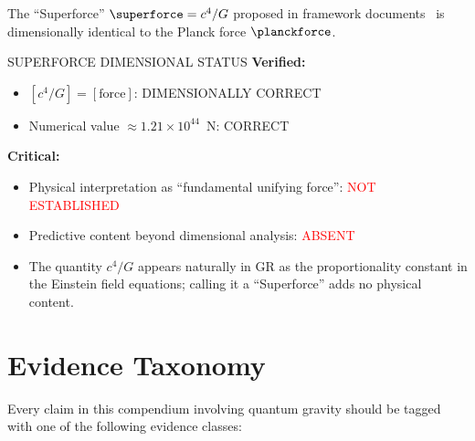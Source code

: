 The ``Superforce'' $\superforce = c^4/G$ proposed in framework
documents~\cite{pais2023superforce} is dimensionally identical to
the Planck force $\planckforce$.

\begin{factcheck}{SUPERFORCE DIMENSIONAL STATUS}
\textbf{Verified:}
\begin{itemize}
    \item $[c^4/G] = [\text{force}]$:
          \textcolor{validcolor}{DIMENSIONALLY CORRECT}
    \item Numerical value $\approx 1.21 \times 10^{44}$~N:
          \textcolor{validcolor}{CORRECT}
\end{itemize}

\textbf{Critical:}
\begin{itemize}
    \item Physical interpretation as ``fundamental unifying force'':
          \textcolor{red}{NOT ESTABLISHED}
    \item Predictive content beyond dimensional analysis:
          \textcolor{red}{ABSENT}
    \item The quantity $c^4/G$ appears naturally in GR as the
          proportionality constant in the Einstein field equations;
          calling it a ``Superforce'' adds no physical content.
\end{itemize}
\end{factcheck}

\section{Evidence Taxonomy}
\label{sec:evidence_taxonomy}

Every claim in this compendium involving quantum gravity should be tagged
with one of the following evidence classes:

